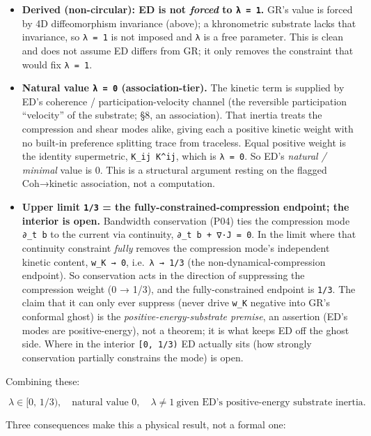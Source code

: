 \documentclass[
]{article}
\begin{document}
\begin{itemize}
\item
  \textbf{Derived (non-circular): ED is not \emph{forced} to
  \texttt{λ\ =\ 1}.} GR's value is forced by 4D diffeomorphism
  invariance (above); a khronometric substrate lacks that invariance, so
  \texttt{λ\ =\ 1} is not imposed and \texttt{λ} is a free parameter.
  This is clean and does not assume ED differs from GR; it only removes
  the constraint that would fix \texttt{λ\ =\ 1}.
\item
  \textbf{Natural value \texttt{λ\ =\ 0} (association-tier).} The
  kinetic term is supplied by ED's coherence / participation-velocity
  channel (the reversible participation ``velocity'' of the substrate;
  §8, an association). That inertia treats the compression and shear
  modes alike, giving each a positive kinetic weight with no built-in
  preference splitting trace from traceless. Equal positive weight is
  the identity supermetric, \texttt{K\_ij\ K\^{}ij}, which is
  \texttt{λ\ =\ 0}. So ED's \emph{natural / minimal} value is 0. This is
  a structural argument resting on the flagged Coh→kinetic association,
  not a computation.
\item
  \textbf{Upper limit \texttt{1/3} = the fully-constrained-compression
  endpoint; the interior is open.} Bandwidth conservation (P04) ties the
  compression mode \texttt{∂\_t\ b} to the current via continuity,
  \texttt{∂\_t\ b\ +\ ∇·J\ =\ 0}. In the limit where that continuity
  constraint \emph{fully} removes the compression mode's independent
  kinetic content, \texttt{w\_K\ →\ 0}, i.e.~\texttt{λ\ →\ 1/3} (the
  non-dynamical-compression endpoint). So conservation acts in the
  direction of suppressing the compression weight (0 → 1/3), and the
  fully-constrained endpoint is \texttt{1/3}. The claim that it can only
  ever suppress (never drive \texttt{w\_K} negative into GR's conformal
  ghost) is the \emph{positive-energy-substrate premise}, an assertion
  (ED's modes are positive-energy), not a theorem; it is what keeps ED
  off the ghost side. Where in the interior \texttt{{[}0,\ 1/3)} ED
  actually sits (how strongly conservation partially constrains the
  mode) is open.
\end{itemize}

Combining these:

\[ \boxed{\;\lambda \in [0,\,1/3),\quad \text{natural value } 0,\quad \lambda \neq 1\ \text{given ED's positive-energy substrate inertia}.\;} \]

Three consequences make this a physical result, not a formal one:
\end{document}
